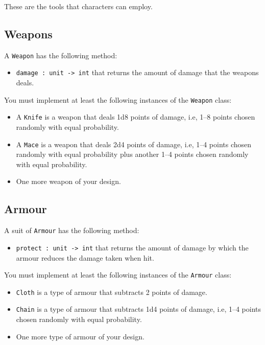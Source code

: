 \documentclass[a4paper]{article}
\begin{document}
These are the tools that characters can employ.

\subsection{Weapons}\label{weapon}

A \texttt{Weapon} has the following method:

\begin{itemize}
\item \texttt{damage : unit -> int} that returns the amount of damage
  that the weapons deals.
\end{itemize}

\noindent
You must implement at least the following instances of the
\texttt{Weapon} class:

\begin{itemize}
\item A \texttt{Knife} is a weapon that deals 1d8 points of damage,
  i.e, 1--8 points chosen randomly with equal probability.

\item A \texttt{Mace} is a weapon that deals 2d4 points of damage,
  i.e, 1--4 points chosen randomly with equal probability plus another
  1--4 points chosen randomly with equal probability.

\item One more weapon of your design.
\end{itemize}

\subsection{Armour}\label{armour}

A suit of \texttt{Armour} has the following method:

\begin{itemize}
\item \texttt{protect : unit -> int} that returns the amount of damage
  by which the armour reduces the damage taken when hit.
\end{itemize}

\noindent
You must implement at least the following instances of the
\texttt{Armour} class:

\begin{itemize}
\item \texttt{Cloth} is a type of armour that subtracts 2 points of
  damage.
\item \texttt{Chain} is a type of armour that subtracts 1d4 points of
  damage, i.e, 1--4 points chosen randomly with equal probability.

\item One more type of armour of your design.
\end{itemize}
\end{document}
